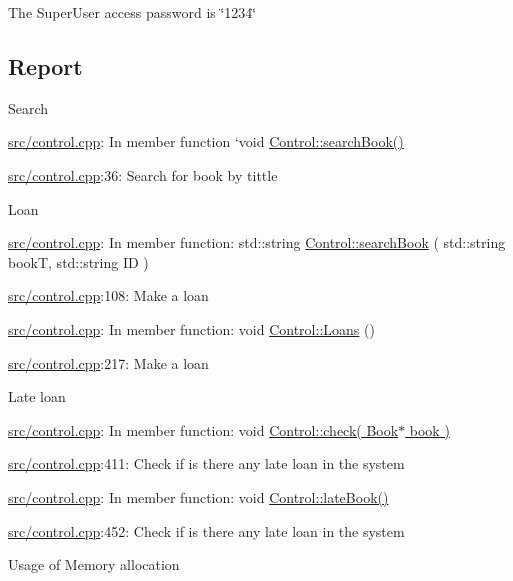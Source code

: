 \begin{DoxyItemize}
\item The Super\+User access password is \char`\"{}1234\char`\"{}
\end{DoxyItemize}

\subsection*{Report}


\begin{DoxyItemize}
\item Search

\hyperlink{control_8cpp}{src/control.\+cpp}\+: In member function ‘void \hyperlink{classControl_a8b6c2e30e71b54786b3ec01e8524076f}{Control\+::search\+Book()}\textquotesingle{}

\hyperlink{control_8cpp}{src/control.\+cpp}\+:36\+: Search for book by tittle
\item Loan

\hyperlink{control_8cpp}{src/control.\+cpp}\+: In member function\+: \textquotesingle{}std\+::string \hyperlink{classControl_a7719518366f488614467555e53a6d0c2}{Control\+::search\+Book} ( std\+::string bookT, std\+::string ID )\textquotesingle{}

\hyperlink{control_8cpp}{src/control.\+cpp}\+:108\+: Make a loan

\hyperlink{control_8cpp}{src/control.\+cpp}\+: In member function\+: \textquotesingle{}void \hyperlink{classControl_ad413782c762539562d2ff9401a54eab3}{Control\+::\+Loans} ()\textquotesingle{}

\hyperlink{control_8cpp}{src/control.\+cpp}\+:217\+: Make a loan
\item Late loan

\hyperlink{control_8cpp}{src/control.\+cpp}\+: In member function\+: \textquotesingle{}void \hyperlink{classControl_a234ad2973e4ad1e4cb9099f75dbdb05f}{Control\+::check( Book$\ast$ book )}\textquotesingle{}

\hyperlink{control_8cpp}{src/control.\+cpp}\+:411\+: Check if is there any late loan in the system

\hyperlink{control_8cpp}{src/control.\+cpp}\+: In member function\+: \textquotesingle{}void \hyperlink{classControl_a94a103e37a13e4bbf4ca7c4a979306bf}{Control\+::late\+Book()}\textquotesingle{}

\hyperlink{control_8cpp}{src/control.\+cpp}\+:452\+: Check if is there any late loan in the system
\item Usage of Memory allocation


\end{DoxyItemize}
